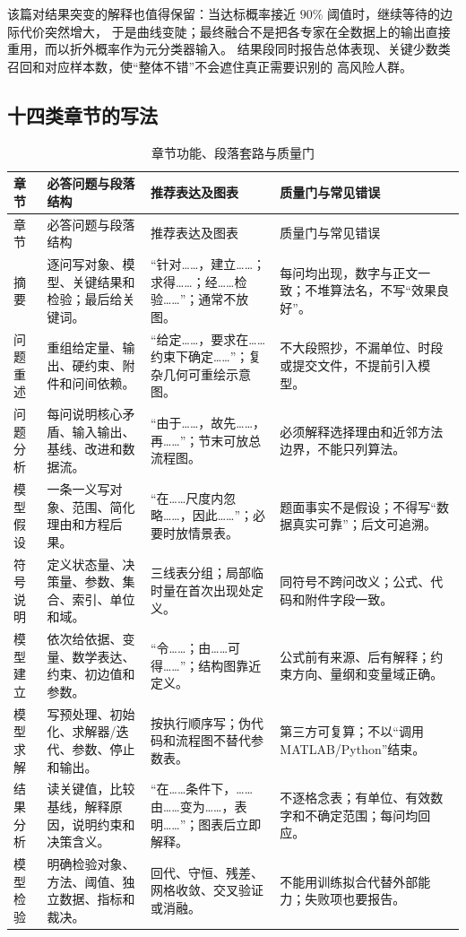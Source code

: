 \documentclass[UTF8,a4paper,12pt]{ctexart}
\begin{document}
该篇对结果突变的解释也值得保留：当达标概率接近 $90\%$ 阈值时，继续等待的边际代价突然增大，
于是曲线变陡；最终融合不是把各专家在全数据上的输出直接重用，而以折外概率作为元分类器输入。
结果段同时报告总体表现、关键少数类召回和对应样本数，使“整体不错”不会遮住真正需要识别的
高风险人群。
\subsection{十四类章节的写法}

\begin{longtable}{p{1.8cm}p{4.2cm}p{4.0cm}p{4.0cm}}
\caption{章节功能、段落套路与质量门}\label{tab:sections}\\
\toprule
章节 & 必答问题与段落结构 & 推荐表达及图表 & 质量门与常见错误\\
\midrule
\endfirsthead
\toprule
章节 & 必答问题与段落结构 & 推荐表达及图表 & 质量门与常见错误\\
\midrule
\endhead
摘要 & 逐问写对象、模型、关键结果和检验；最后给关键词。 & “针对……，建立……；求得……；经……检验……”；通常不放图。 & 每问均出现，数字与正文一致；不堆算法名，不写“效果良好”。\\
问题重述 & 重组给定量、输出、硬约束、附件和问间依赖。 & “给定……，要求在……约束下确定……”；复杂几何可重绘示意图。 & 不大段照抄，不漏单位、时段或提交文件，不提前引入模型。\\
问题分析 & 每问说明核心矛盾、输入输出、基线、改进和数据流。 & “由于……，故先……，再……”；节末可放总流程图。 & 必须解释选择理由和近邻方法边界，不能只列算法。\\
模型假设 & 一条一义写对象、范围、简化理由和方程后果。 & “在……尺度内忽略……，因此……”；必要时放情景表。 & 题面事实不是假设；不得写“数据真实可靠”；后文可追溯。\\
符号说明 & 定义状态量、决策量、参数、集合、索引、单位和域。 & 三线表分组；局部临时量在首次出现处定义。 & 同符号不跨问改义；公式、代码和附件字段一致。\\
模型建立 & 依次给依据、变量、数学表达、约束、初边值和参数。 & “令……；由……可得……”；结构图靠近定义。 & 公式前有来源、后有解释；约束方向、量纲和变量域正确。\\
模型求解 & 写预处理、初始化、求解器/迭代、参数、停止和输出。 & 按执行顺序写；伪代码和流程图不替代参数表。 & 第三方可复算；不以“调用 MATLAB/Python”结束。\\
结果分析 & 读关键值，比较基线，解释原因，说明约束和决策含义。 & “在……条件下，……由……变为……，表明……”；图表后立即解释。 & 不逐格念表；有单位、有效数字和不确定范围；每问均回应。\\
模型检验 & 明确检验对象、方法、阈值、独立数据、指标和裁决。 & 回代、守恒、残差、网格收敛、交叉验证或消融。 & 不能用训练拟合代替外部能力；失败项也要报告。\\

\end{longtable}
\end{document}

